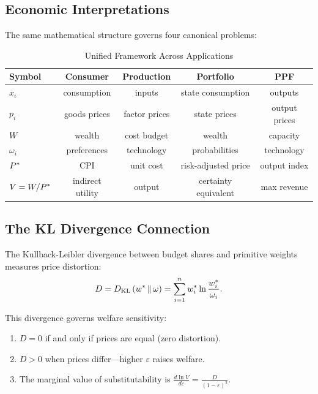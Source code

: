\subsection{Economic Interpretations}
\label{subsec:summary-interpretations}

The same mathematical structure governs four canonical problems:

\begin{table}[H]
\centering
\caption{Unified Framework Across Applications}
\label{tab:summary-applications}
\renewcommand{\arraystretch}{1.4}
\begin{tabular}{@{}lcccc@{}}
\toprule
\textbf{Symbol} & \textbf{Consumer} & \textbf{Production} & \textbf{Portfolio} & \textbf{PPF} \\
\midrule
$x_i$ & consumption & inputs & state consumption & outputs \\
$p_i$ & goods prices & factor prices & state prices & output prices \\
$W$ & wealth & cost budget & wealth & capacity \\
$\omega_i$ & preferences & technology & probabilities & technology \\
$P^{*}$ & CPI & unit cost & risk-adjusted price & output index \\
$V = W/P^{*}$ & indirect utility & output & certainty equivalent & max revenue \\
\bottomrule
\end{tabular}
\end{table}

\subsection{The KL Divergence Connection}
\label{subsec:summary-kl}

The Kullback-Leibler divergence between budget shares and primitive weights measures price distortion:
\begin{equation}
D = D_{\mathrm{KL}}\left(w^* \,\|\, \omega\right) = \sum_{i=1}^{n} w_i^* \ln \frac{w_i^*}{\omega_i}.
\end{equation}

This divergence governs welfare sensitivity:

\begin{enumerate}[leftmargin=2em]
    \item $D = 0$ if and only if prices are equal (zero distortion).
    \item $D > 0$ when prices differ---higher $\varepsilon$ raises welfare.
    \item The marginal value of substitutability is $\displaystyle\frac{d \ln V}{d\varepsilon} = \frac{D}{(1-\varepsilon)^2}$.
\end{enumerate}

